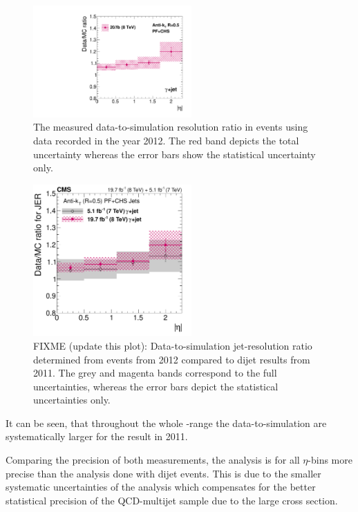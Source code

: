 \begin{figure}[!t]
 \centering
    \includegraphics[width=0.54\textwidth]{figures/resolution/results/MySingleFinalResult.pdf}
  \caption{The measured data-to-simulation resolution ratio in \GAMJET events using data recorded in the year 2012.
           The red band depicts the total uncertainty whereas the error bars show the statistical uncertainty only.}
  \label{res:fig:RatioFinal}
\end{figure}
\begin{figure}[!b]
 \centering
    \includegraphics[width=0.54\textwidth]{figures/resolution/results/resultsComparisonFINAL.pdf}
  \caption{FIXME (update this plot): Data-to-simulation jet-\pt resolution ratio determined from \GAMJET events from 2012 compared to dijet results from 2011.
           The grey and magenta bands correspond to the full uncertainties, whereas the error bars depict the statistical uncertainties only.}
  \label{res:fig:Comparison_2011}
\end{figure}

It can be seen, that throughout the whole \etajet-range the data-to-simulation are systematically larger for the result in 2011. 

Comparing the precision of both measurements, the \GAMJET analysis is for all $\eta$-bins more precise than the analysis done with dijet events.
This is due to the smaller systematic uncertainties of the \GAMJET analysis which compensates for the better statistical precision of the QCD-multijet sample due to the large cross section.


